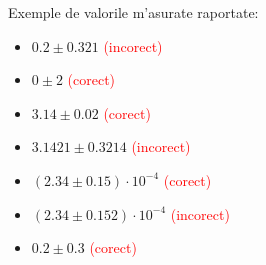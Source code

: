 \begin{exercise}
Exemple de valorile m'asurate raportate:
\begin{itemize}
\item $0.2 \pm 0.321$ \textcolor{red}{(incorect)}
\item $0 \pm 2$ \textcolor{red}{(corect)}
\item $3.14 \pm 0.02$ \textcolor{red}{(corect)}
\item $3.1421 \pm 0.3214$ \textcolor{red}{(incorect)}
\item $(2.34 \pm 0.15)\cdot 10^{-4}$ \textcolor{red}{(corect)}
\item $(2.34 \pm 0.152)\cdot 10^{-4}$ \textcolor{red}{(incorect)}
\item $0.2 \pm 0.3$ \textcolor{red}{(corect)}
\end{itemize}
\end{exercise}


